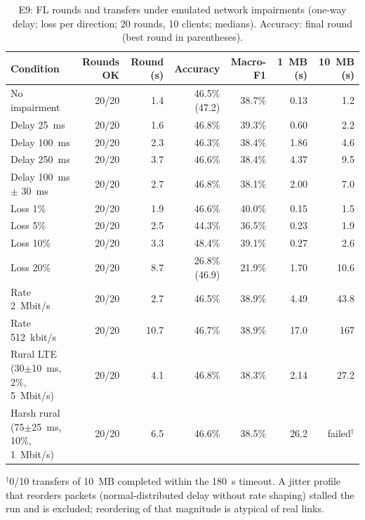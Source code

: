 \documentclass[a4paper,fleqn]{cas-dc}
\begin{document}
\begin{table}[t]
\centering
\caption{E9: FL rounds and transfers under emulated network impairments (one-way delay; loss per direction; 20 rounds, 10 clients; medians). Accuracy: final round (best round in parentheses).}
\label{tab:e9}
\footnotesize
\begin{tabular}{l r r r r r r}
\toprule
\textbf{Condition} & \textbf{Rounds OK} & \textbf{Round (s)} & \textbf{Accuracy} & \textbf{Macro-F1} & \textbf{1~MB (s)} & \textbf{10~MB (s)} \\
\midrule
No impairment                          & 20/20 & 1.4  & 46.5\% (47.2) & 38.7\% & 0.13 & 1.2 \\
Delay 25~ms                            & 20/20 & 1.6  & 46.8\% & 39.3\% & 0.60 & 2.2 \\
Delay 100~ms                           & 20/20 & 2.3  & 46.3\% & 38.4\% & 1.86 & 4.6 \\
Delay 250~ms                           & 20/20 & 3.7  & 46.6\% & 38.4\% & 4.37 & 9.5 \\
Delay 100~ms $\pm$ 30~ms               & 20/20 & 2.7  & 46.8\% & 38.1\% & 2.00 & 7.0 \\
Loss 1\%                               & 20/20 & 1.9  & 46.6\% & 40.0\% & 0.15 & 1.5 \\
Loss 5\%                               & 20/20 & 2.5  & 44.3\% & 36.5\% & 0.23 & 1.9 \\
Loss 10\%                              & 20/20 & 3.3  & 48.4\% & 39.1\% & 0.27 & 2.6 \\
Loss 20\%                              & 20/20 & 8.7  & 26.8\% (46.9) & 21.9\% & 1.70 & 10.6 \\
Rate 2~Mbit/s                          & 20/20 & 2.7  & 46.5\% & 38.9\% & 4.49 & 43.8 \\
Rate 512~kbit/s                        & 20/20 & 10.7 & 46.7\% & 38.9\% & 17.0 & 167 \\
Rural LTE (30$\pm$10~ms, 2\%, 5~Mbit/s) & 20/20 & 4.1 & 46.8\% & 38.3\% & 2.14 & 27.2 \\
Harsh rural (75$\pm$25~ms, 10\%, 1~Mbit/s) & 20/20 & 6.5 & 46.6\% & 38.5\% & 26.2 & failed$^{\dagger}$ \\
\bottomrule
\end{tabular}
\vspace{0.3em}

{\scriptsize $^{\dagger}$0/10 transfers of 10~MB completed within the 180~s timeout. A jitter profile that reorders packets (normal-distributed delay without rate shaping) stalled the run and is excluded; reordering of that magnitude is atypical of real links.}
\end{table}
\end{document}
